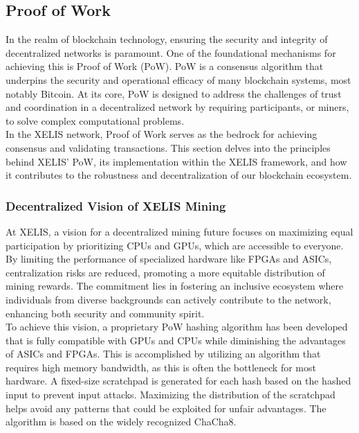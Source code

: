 \documentclass[10pt,a4paper,twocolumn]{article}
\begin{document}
\subsection{Proof of Work}

In the realm of blockchain technology, ensuring the security and integrity of decentralized networks is paramount. One of the foundational mechanisms for achieving this is Proof of Work (PoW). PoW is a consensus algorithm that underpins the security and operational efficacy of many blockchain systems, most notably Bitcoin. At its core, PoW is designed to address the challenges of trust and coordination in a decentralized network by requiring participants, or miners, to solve complex computational problems.\\

In the XELIS network, Proof of Work serves as the bedrock for achieving consensus and validating transactions. This section delves into the principles behind XELIS’ PoW, its implementation within the XELIS framework, and how it contributes to the robustness and decentralization of our blockchain ecosystem.\\

\subsubsection{Decentralized Vision of XELIS Mining}

At XELIS, a vision for a decentralized mining future focuses on maximizing equal participation by prioritizing CPUs and GPUs, which are accessible to everyone. By limiting the performance of specialized hardware like FPGAs and ASICs, centralization risks are reduced, promoting a more equitable distribution of mining rewards. The commitment lies in fostering an inclusive ecosystem where individuals from diverse backgrounds can actively contribute to the network, enhancing both security and community spirit.\\

To achieve this vision, a proprietary PoW hashing algorithm has been developed that is fully compatible with GPUs and CPUs while diminishing the advantages of ASICs and FPGAs. This is accomplished by utilizing an algorithm that requires high memory bandwidth, as this is often the bottleneck for most hardware. A fixed-size scratchpad is generated for each hash based on the hashed input to prevent input attacks. Maximizing the distribution of the scratchpad helps avoid any patterns that could be exploited for unfair advantages. The algorithm is based on the widely recognized ChaCha8.\\
\end{document}
